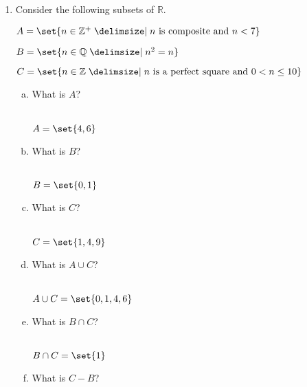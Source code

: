 \documentclass[12pt]{amsart}
\begin{document}
\begin{enumerate}[{\bfseries 1.}]
\newpage
\item Consider the following subsets of $\mathbb{R}$.

	\vspace{0.05in}
	\noindent
	$A=\set{n\in\mathbb{Z}^{+}\given n\text{ is composite and } n<7}$

	\vspace{0.05in}
	\noindent
	$B=\set{n\in\mathbb{Q} \given n^{2}=n}$

	\vspace{0.05in}
	\noindent
	$C=\set{n\in\mathbb{Z}\given n\text{ is a perfect square and } 0<n\leq 10}$

	\begin{enumerate}[(a)]
	\vspace{0.1in}
	\item What is $A$?
	\begin{normalize}
	\vspace{0.1in}
	\\ $A = \set{4, 6}$
	\end{normalize}
	\vspace{0.1in}
	\item What is $B$?
	\begin{normalize}
	\vspace{0.1in}
	\\ $B = \set{0, 1}$
	\end{normalize}
	\vspace{0.1in}
	\item What is $C$?
	\begin{normalize}
	\vspace{0.1in}
	\\ $C = \set{1, 4, 9}$
	\end{normalize}
	\vspace{0.1in}
	\item What is $A\cup C$?
	\begin{normalize}
	\vspace{0.1in}
	\\ $A\cup C = \set{0, 1, 4, 6}$
	\end{normalize}
	\vspace{0.1in}
	\item What is $B\cap C$?
	\begin{normalize}
	\vspace{0.1in}
	\\ $B\cap C = \set{1}$ 
	\end{normalize}
	\vspace{0.1in}
	\item What is $C-B$?

\end{enumerate}
\end{enumerate}
\end{document}
